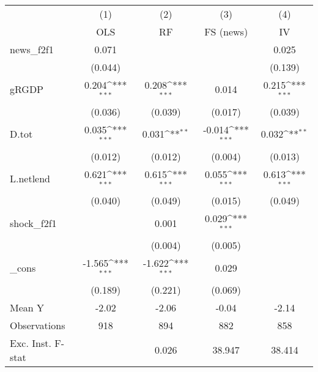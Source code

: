 {
\def\sym#1{\ifmmode^{#1}\else\(^{#1}\)\fi}
\begin{tabular}{l*{4}{c}}
\toprule
            &\multicolumn{1}{c}{(1)}&\multicolumn{1}{c}{(2)}&\multicolumn{1}{c}{(3)}&\multicolumn{1}{c}{(4)}\\
            &\multicolumn{1}{c}{OLS}&\multicolumn{1}{c}{RF}&\multicolumn{1}{c}{FS (news)}&\multicolumn{1}{c}{IV}\\
\midrule
news\_f2f1   &       0.071         &                     &                     &       0.025         \\
            &     (0.044)         &                     &                     &     (0.139)         \\
\addlinespace
gRGDP       &       0.204\sym{***}&       0.208\sym{***}&       0.014         &       0.215\sym{***}\\
            &     (0.036)         &     (0.039)         &     (0.017)         &     (0.039)         \\
\addlinespace
D.tot       &       0.035\sym{***}&       0.031\sym{**} &      -0.014\sym{***}&       0.032\sym{**} \\
            &     (0.012)         &     (0.012)         &     (0.004)         &     (0.013)         \\
\addlinespace
L.netlend   &       0.621\sym{***}&       0.615\sym{***}&       0.055\sym{***}&       0.613\sym{***}\\
            &     (0.040)         &     (0.049)         &     (0.015)         &     (0.049)         \\
\addlinespace
shock\_f2f1  &                     &       0.001         &       0.029\sym{***}&                     \\
            &                     &     (0.004)         &     (0.005)         &                     \\
\addlinespace
\_cons      &      -1.565\sym{***}&      -1.622\sym{***}&       0.029         &                     \\
            &     (0.189)         &     (0.221)         &     (0.069)         &                     \\
\midrule
Mean Y      &       -2.02         &       -2.06         &       -0.04         &       -2.14         \\
Observations&         918         &         894         &         882         &         858         \\
Exc. Inst. F-stat&                     &       0.026         &      38.947         &      38.414         \\
\bottomrule
\end{tabular}
}
